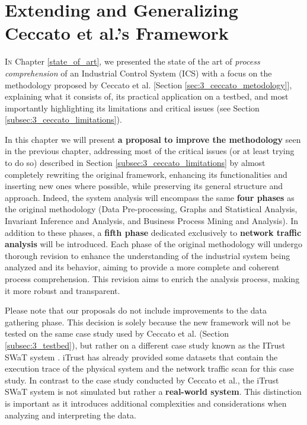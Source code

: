 \chapter{Extending and Generalizing Ceccato et al.’s Framework}
\label{chap:proposal}

\linenumbers
\lettrine[lines=2]{I}{n} Chapter \ref{state_of_art}, we presented the state of the art of \textit{process comprehension} of an Industrial Control System (ICS) with a focus on the methodology proposed by Ceccato et al. \cite{ceccato}[Section \ref{sec:3_ceccato_metodology}], explaining what it consists of, its practical application on a testbed, and most importantly highlighting its limitations and critical issues (see Section \ref{subsec:3_ceccato_limitations}).

\bigskip
In this chapter we will present \textbf{a proposal to improve the methodology} seen in the previous chapter, addressing most of the critical issues (or at least trying to do so) described in Section \ref{subsec:3_ceccato_limitations} by almost completely rewriting the original framework, enhancing its functionalities and inserting new ones where possible, while preserving its general structure and approach. Indeed, the system analysis will encompass the same \textbf{four phases} as the original methodology (Data Pre-processing, Graphs and Statistical Analysis, Invariant Inference and Analysis, and Business Process Mining and Analysis). In addition to these phases, a \textbf{fifth phase} dedicated exclusively to \textbf{network traffic analysis} will be introduced. Each phase of the original methodology will undergo thorough revision to enhance the understanding of the industrial system being analyzed and its behavior, aiming to provide a more complete and coherent process comprehension. This revision aims to enrich the analysis process, making it more robust and transparent.

\bigskip
Please note that our proposals do not include improvements to the data gathering phase. This decision is solely because the new framework will not be tested on the same case study used by Ceccato et al. (Section \ref{subsec:3_testbed}), but rather on a different case study known as the ITrust SWaT system \cite{swat_home}. iTrust has already provided some datasets that contain the execution trace of the physical system and the network traffic scan for this case study. In contrast to the case study conducted by Ceccato et al., the iTrust SWaT system is not simulated but rather a \textbf{real-world system}. This distinction is important as it introduces additional complexities and considerations when analyzing and interpreting the data. 

